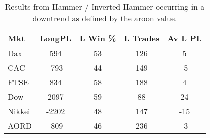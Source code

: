 \begin{table}[ht]
\centering
\caption[Hammer System in downtrend.]{Results from Hammer / Inverted Hammer occurring in a downtrend as defined by the aroon value.} 
\label{tab:hammer_aroon_results}
\begin{tabular}{lcccc}
  \toprule Mkt & LongPL & L Win \% & L Trades & Av L PL \\ 
  \midrule Dax & 594 & 53 & 126 & 5 \\ 
  CAC & -793 & 44 & 149 & -5 \\ 
  FTSE & 834 & 58 & 188 & 4 \\ 
  Dow & 2097 & 59 & 88 & 24 \\ 
  Nikkei & -2202 & 48 & 147 & -15 \\ 
  AORD & -809 & 46 & 236 & -3 \\ 
   \bottomrule \end{tabular}
\end{table}
